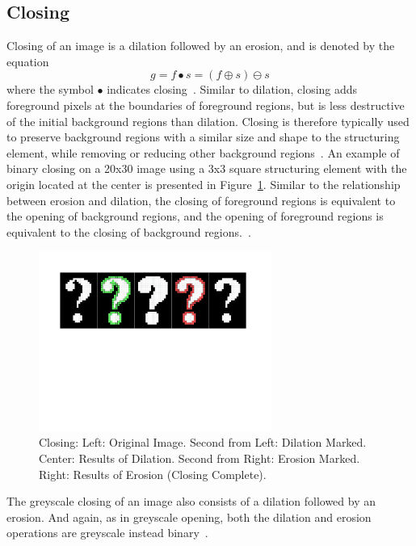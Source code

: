 \documentclass{sig-alternate}
\begin{document}
\subsection{Closing}\label{closing}
Closing of an image is a dilation followed by an erosion, and is denoted by the equation
\begin{equation*}
g = f \bullet s = (f \oplus s) \ominus s
\end{equation*}
where the symbol $\bullet$ indicates closing~\cite{MorphologyWikiAnonymous, MorphologyBook:2000}. Similar to dilation, closing adds foreground pixels at the boundaries of foreground regions, but is less destructive of the initial background regions than dilation. Closing is therefore typically used to preserve background regions with a similar size and shape to the structuring element, while removing or reducing other background regions~\cite{MorphologyWiki}. An example of binary closing on a 20x30 image using a 3x3 square structuring element with the origin located at the center is presented in Figure~\ref{binary closing figure}. Similar to the relationship between erosion and dilation, the closing of foreground regions is equivalent to the opening of background regions, and the opening of foreground regions is equivalent to the closing of background regions.~\cite{MorphologyWiki}.
\begin{figure}
\centering
\includegraphics[width=3in,trim={0 4.75in 0 0},clip]{closing}
\caption{Closing: Left: Original Image. Second from Left: Dilation Marked. Center: Results of Dilation. Second from Right: Erosion Marked. Right: Results of Erosion (Closing Complete).}
\label{binary closing figure}
\end{figure}

The greyscale closing of an image also consists of a dilation followed by an erosion. And again, as in greyscale opening, both the dilation and erosion operations are greyscale instead binary~\cite{MorphologyPaper:1987}.
\end{document}

